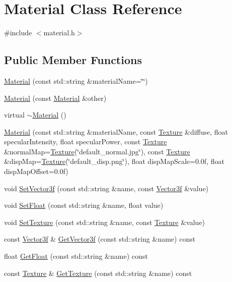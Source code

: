 \hypertarget{class_material}{}\section{Material Class Reference}
\label{class_material}


{\ttfamily \#include $<$material.\+h$>$}

\subsection*{Public Member Functions}
\begin{DoxyCompactItemize}
\item 
\hyperlink{class_material_a9d10a10cc924f93d0ba35b9ada36760b}{Material} (const std\+::string \&material\+Name=\char`\"{}\char`\"{})
\item 
\hyperlink{class_material_ac9b027e9c501776e7d08589a52e9d795}{Material} (const \hyperlink{class_material}{Material} \&other)
\item 
virtual \hyperlink{class_material_a2c19452d71f54075df8f5405b03129f4}{$\sim$\+Material} ()
\item 
\hyperlink{class_material_a7ff625f38afbe0aeab9b9194848fd414}{Material} (const std\+::string \&material\+Name, const \hyperlink{class_texture}{Texture} \&diffuse, float specular\+Intensity, float specular\+Power, const \hyperlink{class_texture}{Texture} \&normal\+Map=\hyperlink{class_texture}{Texture}(\char`\"{}default\+\_\+normal.\+jpg\char`\"{}), const \hyperlink{class_texture}{Texture} \&disp\+Map=\hyperlink{class_texture}{Texture}(\char`\"{}default\+\_\+disp.\+png\char`\"{}), float disp\+Map\+Scale=0.\+0f, float disp\+Map\+Offset=0.\+0f)
\item 
void \hyperlink{class_material_a1d9130a097b656a99432d9374c887628}{Set\+Vector3f} (const std\+::string \&name, const \hyperlink{class_vector3f}{Vector3f} \&value)
\item 
void \hyperlink{class_material_a3384bed1fe3b09c204f152fb87fcd07f}{Set\+Float} (const std\+::string \&name, float value)
\item 
void \hyperlink{class_material_aa893cae3c708567d40b66af16a2b23d9}{Set\+Texture} (const std\+::string \&name, const \hyperlink{class_texture}{Texture} \&value)
\item 
const \hyperlink{class_vector3f}{Vector3f} \& \hyperlink{class_material_adbb92ca797733a8b462cda22e2483ea8}{Get\+Vector3f} (const std\+::string \&name) const 
\item 
float \hyperlink{class_material_a6460a48e7a6b759e8252d4a45e724496}{Get\+Float} (const std\+::string \&name) const 
\item 
const \hyperlink{class_texture}{Texture} \& \hyperlink{class_material_a9e100e2394f55299d8cb0556387deab3}{Get\+Texture} (const std\+::string \&name) const 
\end{DoxyCompactItemize}


